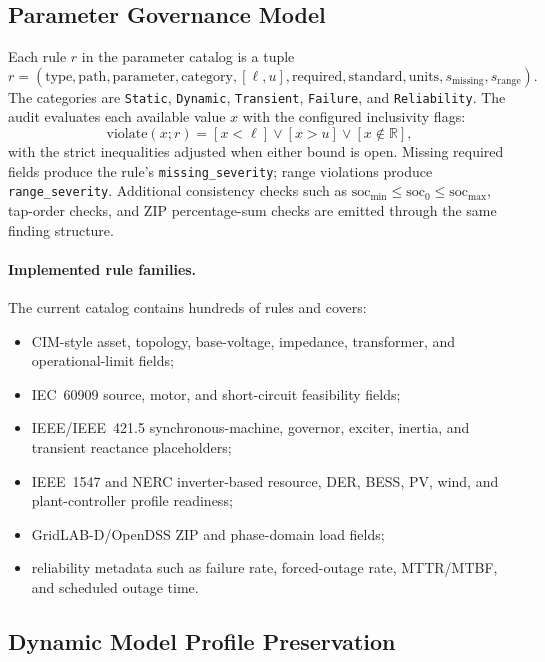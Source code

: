 \subsection{Parameter Governance Model}

Each rule \(r\) in the parameter catalog is a tuple
\[
  r =
  \left(
    \mathrm{type}, \mathrm{path}, \mathrm{parameter}, \mathrm{category},
    [\ell,u], \mathrm{required}, \mathrm{standard}, \mathrm{units},
    s_{\mathrm{missing}}, s_{\mathrm{range}}
  \right).
\]
The categories are \texttt{Static}, \texttt{Dynamic}, \texttt{Transient},
\texttt{Failure}, and \texttt{Reliability}.  The audit evaluates each available
value \(x\) with the configured inclusivity flags:
\[
  \mathrm{violate}(x;r) =
  [x < \ell] \lor [x > u] \lor [x \notin \mathbb{R}],
\]
with the strict inequalities adjusted when either bound is open.  Missing
required fields produce the rule's \texttt{missing\_severity}; range violations
produce \texttt{range\_severity}.  Additional consistency checks such as
\(\mathrm{soc}_{\min}\le \mathrm{soc}_{0}\le \mathrm{soc}_{\max}\), tap-order
checks, and ZIP percentage-sum checks are emitted through the same finding
structure.

\paragraph{Implemented rule families.}
The current catalog contains hundreds of rules and covers:
\begin{itemize}
  \item CIM-style asset, topology, base-voltage, impedance, transformer, and
        operational-limit fields;
  \item IEC~60909 source, motor, and short-circuit feasibility fields;
  \item IEEE/IEEE~421.5 synchronous-machine, governor, exciter, inertia, and
        transient reactance placeholders;
  \item IEEE~1547 and NERC inverter-based resource, DER, BESS, PV, wind, and
        plant-controller profile readiness;
  \item GridLAB-D/OpenDSS ZIP and phase-domain load fields;
  \item reliability metadata such as failure rate, forced-outage rate,
        MTTR/MTBF, and scheduled outage time.
\end{itemize}

\subsection{Dynamic Model Profile Preservation}

